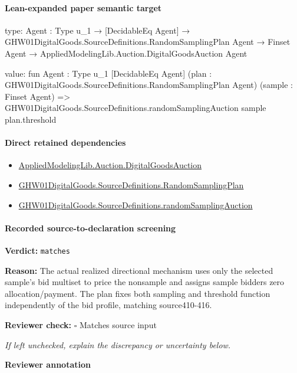 \documentclass[10pt]{article}
\newcommand{\reviewerbox}{%
  \par\noindent\fbox{\parbox{0.96\linewidth}{\rule{0pt}{0.38in}}}\par
}
\newcommand{\reviewmatch}[1]{%
  \par\noindent\textbf{Reviewer check:} $\square$\; #1\par
  \noindent\emph{If left unchecked, explain the discrepancy or uncertainty below.}\par
}
\begin{document}
\paragraph{Lean-expanded paper semantic target}
\begin{ReviewVerbatim}
type:
{Agent : Type u_1} →
  [DecidableEq Agent] →
    GHW01DigitalGoods.SourceDefinitions.RandomSamplingPlan Agent →
      Finset Agent → AppliedModelingLib.Auction.DigitalGoodsAuction Agent

value:
fun {Agent : Type u_1} [DecidableEq Agent] (plan : GHW01DigitalGoods.SourceDefinitions.RandomSamplingPlan Agent)
    (sample : Finset Agent) =>
  GHW01DigitalGoods.SourceDefinitions.randomSamplingAuction sample plan.threshold
\end{ReviewVerbatim}

\paragraph{Direct retained dependencies}
\begin{itemize}\raggedright
\item \hyperlink{governing-declaration-7d5372964da104c4}{Applied\allowbreak{}Modeling\allowbreak{}Lib.\allowbreak{}Auction.\allowbreak{}Digital\allowbreak{}Goods\allowbreak{}Auction}
\item \hyperlink{governing-declaration-6a810a14ccada3a3}{GHW01\allowbreak{}Digital\allowbreak{}Goods.\allowbreak{}Source\allowbreak{}Definitions.\allowbreak{}Random\allowbreak{}Sampling\allowbreak{}Plan}
\item \hyperlink{governing-declaration-b3f0d127dab9fff7}{GHW01\allowbreak{}Digital\allowbreak{}Goods.\allowbreak{}Source\allowbreak{}Definitions.\allowbreak{}random\allowbreak{}Sampling\allowbreak{}Auction}
\end{itemize}
\paragraph{Recorded source-to-declaration screening}
\textbf{Verdict:} \texttt{matches}
\\
{\raggedright
\textbf{Reason:} The actual realized directional mechanism uses only the selected sample's bid multiset to price the nonsample and assigns sample bidders zero allocation/\allowbreak{}payment.\allowbreak{} The plan fixes both sampling and threshold function independently of the bid profile, matching source410-\allowbreak{}416.\allowbreak{}
\par}
\reviewmatch{Matches source input}
\noindent\textbf{Reviewer annotation}\par
\reviewerbox
\clearpage
\hypertarget{paper-prerequisite-f583834499457af5}{}
\end{document}
